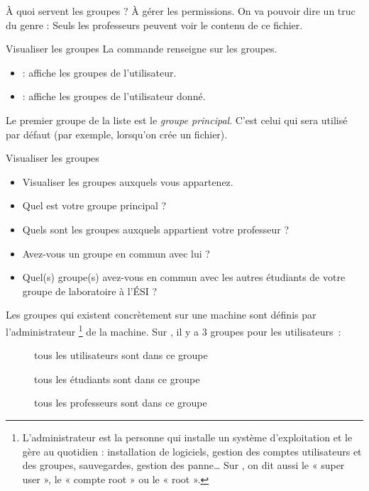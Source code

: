 \documentclass[a4paper,11pt]{style-esi/td}
\begin{document}
		À quoi servent les groupes ? 
		À gérer les permissions. 
		On va pouvoir dire un truc du genre : 
		\og{}Seuls les professeurs peuvent voir le contenu de ce fichier\fg{}.

		\begin{theorie}{Visualiser les groupes}
			La commande  renseigne sur les groupes.
			\begin{itemize}
				\item {} : affiche les groupes de l'utilisateur.
				\item {} : affiche les groupes de 
				l'utilisateur donné.
			\end{itemize}
			Le premier groupe de la liste est le \emph{groupe principal}.
			C'est celui qui sera utilisé par défaut (par exemple, 
			lorsqu'on crée un fichier).
		\end{theorie}

		\begin{Exercice}{Visualiser les groupes}
			\vspace{-1em}
			\begin{itemize}
				\item Visualiser les groupes auxquels vous appartenez.
				\item Quel est votre groupe principal ? 
				\item Quels sont les groupes auxquels appartient votre professeur ?
				\item Avez-vous un groupe en commun avec lui ?
				\item Quel(s) groupe(s)  avez-vous en commun avec les 
				autres étudiants de votre groupe de laboratoire à l'ÉSI ?
			\end{itemize}
		\end{Exercice}

		\begin{colxbox}[colback=white,drop fuzzy shadow]
			Les groupes qui existent concrètement sur une machine sont définis 
			par l'administrateur%
			\footnote{
				L'administrateur est la personne qui installe 
				un système d'exploitation et le gère au quotidien : 
				installation de logiciels, 
				gestion des comptes utilisateurs et des groupes, 
				sauvegardes, gestion des panne\dots{}
				Sur , on dit aussi le « super user », 
				le « compte root » ou le « root ».
			} de la machine. 		
			Sur , 
			il y a 3 groupes pour les utilisateurs~:
			\begin{description}
				\item[] tous les utilisateurs sont dans ce groupe
				\item[] tous les étudiants sont dans ce groupe
				\item[] tous les professeurs sont dans ce groupe	
			\end{description}
		\end{colxbox}
\end{document}
